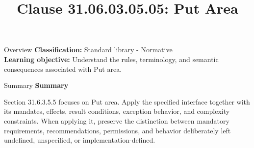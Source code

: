 \documentclass[10pt,letterpaper]{article}
\title{Clause 31.06.03.05.05: Put Area}
\author{}
\date{}
\begin{document}
\maketitle
\begin{CornellOverviewBox}{Overview}
\textbf{Classification:} Standard library - Normative\\[2pt]
\textbf{Learning objective:} Understand the rules, terminology, and semantic consequences associated with Put area.
\end{CornellOverviewBox}\begin{CornellSummaryBox}{Summary}
{\sffamily\bfseries\color{Accent} Summary}\par\vspace{3pt}Section 31.6.3.5.5 focuses on Put area. Apply the specified interface together with its mandates, effects, result conditions, exception behavior, and complexity constraints. When applying it, preserve the distinction between mandatory requirements, recommendations, permissions, and behavior deliberately left undefined, unspecified, or implementation-defined.
\end{CornellSummaryBox}
\end{document}
